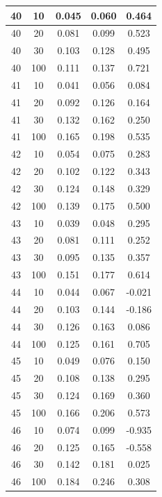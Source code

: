 \begin{longtable}{ |c|c|c|c|c| }
            40 & 10 & 0.045 & 0.060 & 0.464 \\ \hline
            40 & 20 & 0.081 & 0.099 & 0.523 \\ \hline
            40 & 30 & 0.103 & 0.128 & 0.495 \\ \hline
            40 & 100 & 0.111 & 0.137 & 0.721 \\ \hline
            41 & 10 & 0.041 & 0.056 & 0.084 \\ \hline
            41 & 20 & 0.092 & 0.126 & 0.164 \\ \hline
            41 & 30 & 0.132 & 0.162 & 0.250 \\ \hline
            41 & 100 & 0.165 & 0.198 & 0.535 \\ \hline
            42 & 10 & 0.054 & 0.075 & 0.283 \\ \hline
            42 & 20 & 0.102 & 0.122 & 0.343 \\ \hline
            42 & 30 & 0.124 & 0.148 & 0.329 \\ \hline
            42 & 100 & 0.139 & 0.175 & 0.500 \\ \hline
            43 & 10 & 0.039 & 0.048 & 0.295 \\ \hline
            43 & 20 & 0.081 & 0.111 & 0.252 \\ \hline
            43 & 30 & 0.095 & 0.135 & 0.357 \\ \hline
            43 & 100 & 0.151 & 0.177 & 0.614 \\ \hline
            44 & 10 & 0.044 & 0.067 & -0.021 \\ \hline
            44 & 20 & 0.103 & 0.144 & -0.186 \\ \hline
            44 & 30 & 0.126 & 0.163 & 0.086 \\ \hline
            44 & 100 & 0.125 & 0.161 & 0.705 \\ \hline
            45 & 10 & 0.049 & 0.076 & 0.150 \\ \hline
            45 & 20 & 0.108 & 0.138 & 0.295 \\ \hline
            45 & 30 & 0.124 & 0.169 & 0.360 \\ \hline
            45 & 100 & 0.166 & 0.206 & 0.573 \\ \hline
            46 & 10 & 0.074 & 0.099 & -0.935 \\ \hline
            46 & 20 & 0.125 & 0.165 & -0.558 \\ \hline
            46 & 30 & 0.142 & 0.181 & 0.025 \\ \hline
            46 & 100 & 0.184 & 0.246 & 0.308 \\ \hline

\end{longtable}
